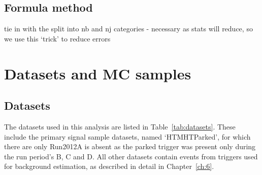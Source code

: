 \subsection{Formula method}

tie in with the split into nb and nj categories - necessary as stats will reduce, so we use
this `trick' to reduce errors



\section{Datasets and MC samples}

\subsection{Datasets}

The datasets used in this analysis are listed in Table~\ref{tab:datasets}. These
include the primary signal sample datasets, named `HTMHTParked', for which there
are only Run2012A is absent as the parked trigger was present only during the 
run period's B, C and D. All other datasets contain events from triggers used for 
background estimation, as described in detail in Chapter~\ref{ch:6}.

